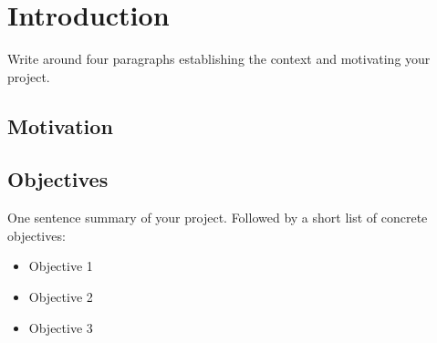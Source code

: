 \chapter{Introduction}
\label{ch:introduction}

Write around four paragraphs establishing the context and motivating your project.

\section{Motivation}

\section{Objectives}

One sentence summary of your project. Followed by a short list of concrete objectives:

\begin{itemize}
    \item Objective 1
    \item Objective 2
    \item Objective 3
\end{itemize}